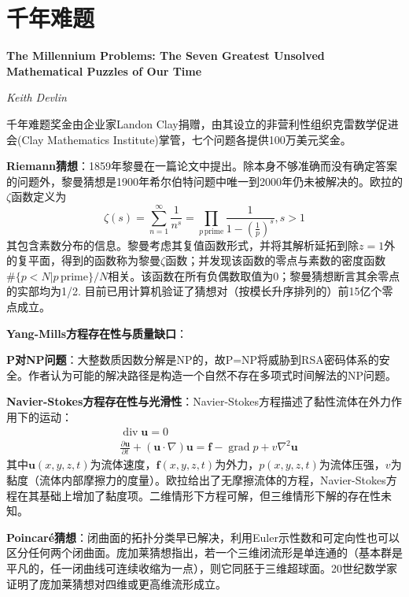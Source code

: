 \chapter{千年难题}
\Large\textbf{The Millennium Problems: The Seven Greatest Unsolved Mathematical Puzzles of Our Time}
\par \emph{Keith Devlin} \normalsize

\par 千年难题奖金由企业家Landon Clay捐赠，由其设立的非营利性组织克雷数学促进会(Clay Mathematics Institute)掌管，七个问题各提供100万美元奖金。

\par \textbf{Riemann猜想}：1859年黎曼在一篇论文中提出。除本身不够准确而没有确定答案的问题外，黎曼猜想是1900年希尔伯特问题中唯一到2000年仍未被解决的。欧拉的$\zeta$函数定义为
\begin{equation}
    \zeta(s)=\sum_{n=1}^\infty \frac{1}{n^s}=\prod_{p\, \text{prime}}\frac{1}{1-(\frac{1}{p})^s}, s>1
\end{equation}
其包含素数分布的信息。黎曼考虑其复值函数形式，并将其解析延拓到除$z=1$外的复平面，得到的函数称为黎曼$\zeta$函数；并发现该函数的零点与素数的密度函数$\#\{p<N\vert p\, \text{prime}\}/N$相关。该函数在所有负偶数取值为0；黎曼猜想断言其余零点的实部均为1/2. 目前已用计算机验证了猜想对（按模长升序排列的）前15亿个零点成立。

\par \textbf{Yang-Mills方程存在性与质量缺口}：

\par \textbf{P对NP问题}：大整数质因数分解是NP的，故P=NP将威胁到RSA密码体系的安全。作者认为可能的解决路径是构造一个自然不存在多项式时间解法的NP问题。

\par \textbf{Navier-Stokes方程存在性与光滑性}：Navier-Stokes方程描述了黏性流体在外力作用下的运动：
\begin{align}
    &\operatorname{div} \mathbf{u} =0\\
    &\frac{\partial \mathbf{u}}{\partial t}+(\mathbf{u}\cdot  \nabla)\mathbf{u}=\mathbf{f}-\operatorname{grad} p + v \nabla^2 \mathbf{u}
\end{align}
其中$\mathbf{u}(x,y,z,t)$为流体速度，$\mathbf{f}(x,y,z,t)$为外力，$p(x,y,z,t)$为流体压强，$v$为黏度（流体内部摩擦力的度量）。欧拉给出了无摩擦流体的方程，Navier-Stokes方程在其基础上增加了黏度项。二维情形下方程可解，但三维情形下解的存在性未知。

\par \textbf{Poincaré猜想}：闭曲面的拓扑分类早已解决，利用Euler示性数和可定向性也可以区分任何两个闭曲面。庞加莱猜想指出，若一个三维闭流形是单连通的（基本群是平凡的，任一闭曲线可连续收缩为一点），则它同胚于三维超球面。20世纪数学家证明了庞加莱猜想对四维或更高维流形成立。

